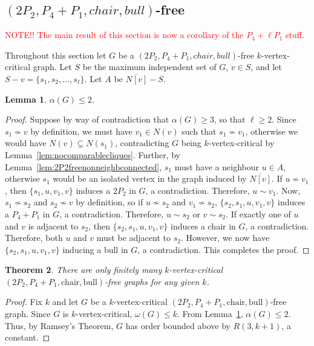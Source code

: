 \documentclass[11pt]{article}
\newtheorem{theorem}{Theorem}[section]
\newtheorem{lemma}[theorem]{Lemma}
\theoremstyle{definition}
\newcommand{\noneighbs}{\overline{N[v]}}
\begin{document}
\subsection{$(2P_2, P_4 + P_1, chair, bull)$-free}
\textcolor{red}{NOTE!! The main result of this section is now a corollary of the $P_4+\ell P_1$ stuff}.

Throughout this section let $G$ be a $(2P_2, P_4 + P_1, chair, bull)$-free $k$-vertex-critical graph. Let $S$ be the maximum independent set of $G$, $v \in S$, and let $S-v=\{s_1,s_2,\dots,s_{\ell}\}$. Let $A$ be $\noneighbs - S$. 

\begin{lemma}\label{lem:indnumatmost2bullchair}
$\alpha(G)\le 2$.
\end{lemma}
\begin{proof}
Suppose by way of contradiction that $\alpha(G)\ge 3$, so that $\ell\ge 2$. Since $s_1\nsim v$ by definition, we must have $v_1\in N(v)$ such that $s_1\nsim v_1$, otherwise we would have $N(v)\subseteq N(s_1)$, contradicting $G$ being $k$-vertex-critical by Lemma~\ref{lem:nocomparablecliques}. Further, by Lemma~\ref{lem:2P2freenonneighbconnected}, $s_1$ must have a neighbour $u\in A$, otherwise $s_1$ would be an isolated vertex in the graph induced by $\noneighbs$. If $u\nsim v_1$, then $\{s_1,u,v_1,v\}$ induces a $2P_2$ in $G$, a contradiction. Therefore, $u\sim v_1$. Now, $s_1\nsim s_2$ and $s_2\nsim v$ by definition, so if $u\nsim s_2$ and $v_1\nsim s_2$, $\{s_2,s_1,u,v_1,v\}$ induces a $P_4+P_1$ in $G$, a contradiction. Therefore, $u\sim s_2$ or $v\sim s_2$. If exactly one of $u$ and $v$ is adjacent to $s_2$, then $\{s_2,s_1,u,v_1,v\}$ induces a chair in $G$, a contradiction. Therefore, both $u$ and $v$ must be adjacent to $s_2$. However, we now have $\{s_2,s_1,u,v_1,v\}$ inducing a bull in $G$, a contradiction. This completes the proof.
\end{proof}

\begin{theorem}
There are only finitely many $k$-vertex-critical $(2P_2, P_4 + P_1,\text{chair}, \text{bull})$-free graphs for any given $k$.
\end{theorem}
\begin{proof}
Fix $k$ and let $G$ be a $k$-vertex-critical $(2P_2, P_4 + P_1,\text{chair}, \text{bull})$-free graph. Since $G$ is $k$-vertex-critical, $\omega(G)\le k$. From Lemma~\ref{lem:indnumatmost2bullchair}, $\alpha(G)\le 2$. Thus, by Ramsey's Theorem, $G$ has order bounded above by $R(3,k+1)$, a constant.
\end{proof}
\end{document}
